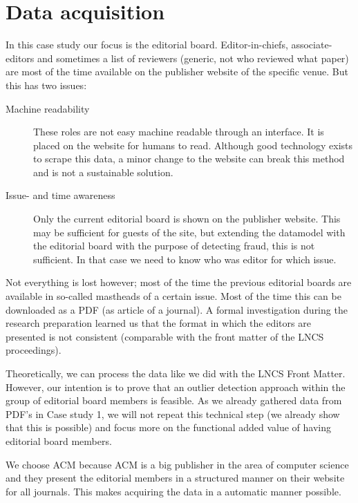 \documentclass{ou-report}
\begin{document}
\section{Data acquisition}
In this case study our focus is the editorial board. Editor-in-chiefs, 
associate-editors and sometimes a list of reviewers (generic, not who reviewed 
what paper) are most of the time available on the publisher website of the 
specific venue. But this has two issues:
\begin{description}
    \item[Machine readability] These roles are not easy machine readable 
    through an interface. It is placed on the website for humans to read. 
    Although good technology exists to scrape this data, a minor change to 
    the website can break this method and is not a sustainable solution.
    \item[Issue- and time awareness] Only the current editorial board is 
    shown on the publisher website. This may be sufficient for guests of the 
    site, but extending the datamodel with the editorial board with the 
    purpose of detecting fraud, this is not sufficient. In that case we need 
    to know who was editor for which issue. 
\end{description}
Not everything is lost however; most of the time the previous editorial 
boards are available in so-called mastheads of a certain issue. Most of the 
time this can be downloaded as a PDF (as article of a journal). A formal 
investigation during the research preparation learned us that the format in 
which the editors are presented is not consistent (comparable with the 
front matter of the LNCS proceedings).

Theoretically, we can process the data like we did with the LNCS Front 
Matter. However, our intention is to prove that an outlier detection 
approach within the group of editorial board members is feasible. As we 
already gathered data from PDF's in Case study 1, we will not repeat this 
technical step (we already show that this is possible) and focus more on 
the functional added value of having editorial board members.

We choose ACM because ACM is a big publisher in the area of computer science
and they present the editorial members in a structured manner on their 
website for all journals. This makes acquiring the data in a automatic 
manner possible.
\end{document}
